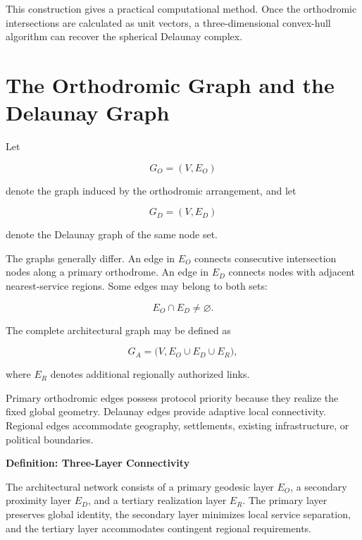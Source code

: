 \documentclass[11pt,fleqn]{book}
\numberwithin{equation}{chapter}
\newenvironment{definition}[1]
  {\begin{definitionEnv}
   \noindent\textbf{Definition: #1}\par\smallskip}
  {\end{definitionEnv}}
\theoremstyle{plain}
\theoremstyle{definition}
\theoremstyle{remark}
\begin{document}
This construction gives a practical computational method. Once the orthodromic intersections are calculated as unit vectors, a three-dimensional convex-hull algorithm can recover the spherical Delaunay complex.

\section{The Orthodromic Graph and the Delaunay Graph}

Let

\begin{equation}
    G_O=(V,E_O)
\end{equation}

denote the graph induced by the orthodromic arrangement, and let

\begin{equation}
    G_D=(V,E_D)
\end{equation}

denote the Delaunay graph of the same node set.

The graphs generally differ. An edge in \(E_O\) connects consecutive intersection nodes along a primary orthodrome. An edge in \(E_D\) connects nodes with adjacent nearest-service regions. Some edges may belong to both sets:

\begin{equation}
    E_O\cap E_D\neq\varnothing.
\end{equation}

The complete architectural graph may be defined as

\begin{equation}
    G_A
    =
    \bigl(
      V,
      E_O\cup E_D\cup E_R
    \bigr),
\end{equation}

where \(E_R\) denotes additional regionally authorized links.

Primary orthodromic edges possess protocol priority because they realize the fixed global geometry. Delaunay edges provide adaptive local connectivity. Regional edges accommodate geography, settlements, existing infrastructure, or political boundaries.

\begin{definition}{Three-Layer Connectivity}
The architectural network consists of a primary geodesic layer \(E_O\), a secondary proximity layer \(E_D\), and a tertiary realization layer \(E_R\). The primary layer preserves global identity, the secondary layer minimizes local service separation, and the tertiary layer accommodates contingent regional requirements.
\end{definition}
\end{document}
